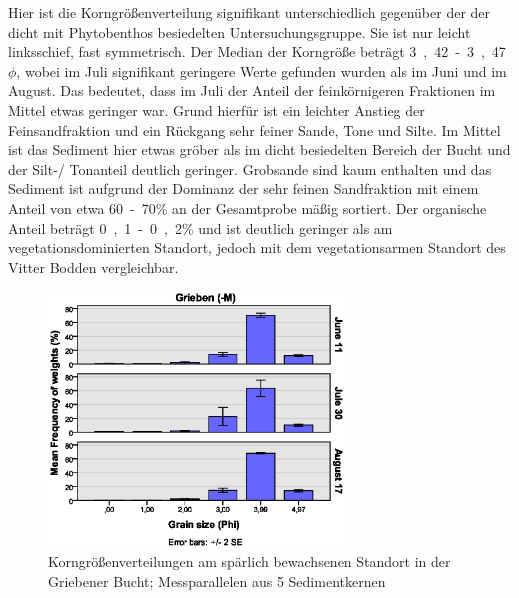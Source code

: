 Hier ist die Korngrößenverteilung signifikant unterschiedlich gegenüber der der dicht mit Phytobenthos besiedelten Untersuchungsgruppe. Sie ist nur leicht linksschief, fast symmetrisch. Der Median der Korngröße beträgt \unit{3,42-3,47}{$\phi$}, wobei im Juli signifikant geringere Werte gefunden wurden als im Juni und im August. Das bedeutet, dass im Juli der Anteil der feinkörnigeren Fraktionen im Mittel etwas geringer war. Grund hierfür ist ein leichter Anstieg der Feinsandfraktion und ein Rückgang sehr feiner Sande, Tone und Silte. Im Mittel ist das Sediment hier etwas gröber als im dicht besiedelten Bereich der Bucht und der Silt-/ Tonanteil deutlich geringer. Grobsande sind kaum enthalten und das Sediment ist aufgrund der Dominanz der sehr feinen Sandfraktion mit einem Anteil von etwa \unit{60-70}{\%} an der Gesamtprobe mäßig sortiert. Der organische Anteil beträgt \unit{0,1-0,2}{\%} und ist deutlich geringer als am vegetationsdominierten Standort, jedoch mit dem vegetationsarmen Standort des Vitter Bodden vergleichbar.



\begin{figure}[!htb]
\centering
\includegraphics[width=0.70\textwidth]{images/grainsize/sediment_im_jahr4.eps}
\caption[Korngrößenverteilungen Grieben (-M)]{Korngrößenverteilungen am spärlich bewachsenen Standort in der Griebener Bucht; Messparallelen aus 5 Sedimentkernen}
\label{fig:korngrössen_Grieben_-m}
\end{figure}




\FloatBarrier



